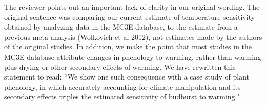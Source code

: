 \documentclass[11pt,a4paper]{letter}
\begin{document}
\par The reviewer points out an important lack of clarity in our original wording. The original sentence was comparing our current estimate of temperature sensitivity obtained by analyzing data in the MC3E database, to the estimate from a previous meta-analysis (Wolkovich et al 2012), not estimates made by the authors of the original studies.  In addition, we make the point that most studies in the MC3E database attribute changes in phenology to warming, rather than warming plus drying or other secondary effects of warming. We have rewritten this statement to read: ``We show one such consequence with a case study of plant phenology, in which accurately accounting for climate manipulation and its secondary effects triples the estimated sensitivity of budburst to warming."  

\\
\end{document}
